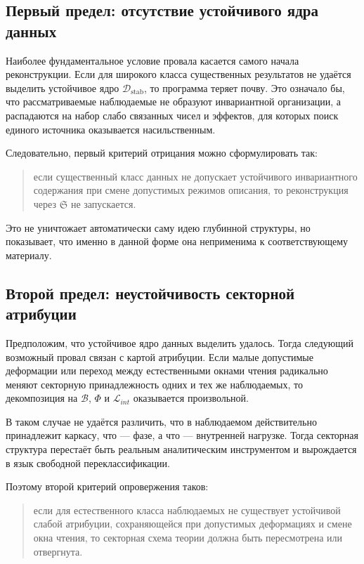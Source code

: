 \documentclass[12pt,a4paper]{article}
\begin{document}
\subsection{Первый предел: отсутствие устойчивого ядра данных}

Наиболее фундаментальное условие провала касается самого начала реконструкции. Если для широкого класса существенных результатов не удаётся выделить устойчивое ядро \(\mathcal{D}_{\mathrm{stab}}\), то программа теряет почву. Это означало бы, что рассматриваемые наблюдаемые не образуют инвариантной организации, а распадаются на набор слабо связанных чисел и эффектов, для которых поиск единого источника оказывается насильственным.

Следовательно, первый критерий отрицания можно сформулировать так:
\begin{quote}
если существенный класс данных не допускает устойчивого инвариантного содержания при смене допустимых режимов описания, то реконструкция через \(\mathfrak{S}\) не запускается.
\end{quote}

Это не уничтожает автоматически саму идею глубинной структуры, но показывает, что именно в данной форме она неприменима к соответствующему материалу.

\subsection{Второй предел: неустойчивость секторной атрибуции}

Предположим, что устойчивое ядро данных выделить удалось. Тогда следующий возможный провал связан с картой атрибуции. Если малые допустимые деформации или переход между естественными окнами чтения радикально меняют секторную принадлежность одних и тех же наблюдаемых, то декомпозиция на \(\mathcal{B}\), \(\Phi\) и \(\mathcal{L}_{int}\) оказывается произвольной.

В таком случае не удаётся различить, что в наблюдаемом действительно принадлежит каркасу, что --- фазе, а что --- внутренней нагрузке. Тогда секторная структура перестаёт быть реальным аналитическим инструментом и вырождается в язык свободной переклассификации.

Поэтому второй критерий опровержения таков:
\begin{quote}
если для естественного класса наблюдаемых не существует устойчивой слабой атрибуции, сохраняющейся при допустимых деформациях и смене окна чтения, то секторная схема теории должна быть пересмотрена или отвергнута.
\end{quote}
\end{document}
